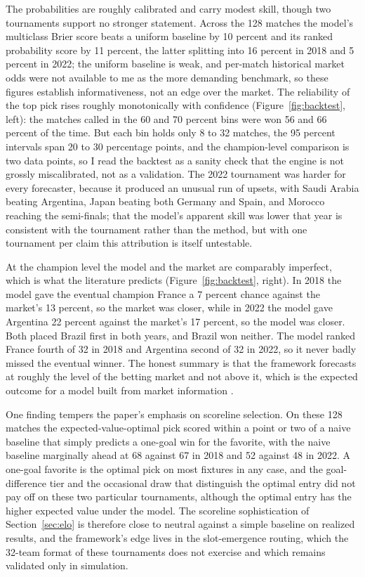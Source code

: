 \documentclass[11pt,letterpaper]{article}
\begin{document}
The probabilities are roughly calibrated and carry modest skill, though two tournaments support no stronger statement. Across the 128 matches the model's multiclass Brier score beats a uniform baseline by 10 percent and its ranked probability score \citep{constantinou2012} by 11 percent, the latter splitting into 16 percent in 2018 and 5 percent in 2022; the uniform baseline is weak, and per-match historical market odds were not available to me as the more demanding benchmark, so these figures establish informativeness, not an edge over the market. The reliability of the top pick rises roughly monotonically with confidence (Figure~\ref{fig:backtest}, left): the matches called in the 60 and 70 percent bins were won 56 and 66 percent of the time. But each bin holds only 8 to 32 matches, the 95 percent intervals span 20 to 30 percentage points, and the champion-level comparison is two data points, so I read the backtest as a sanity check that the engine is not grossly miscalibrated, not as a validation. The 2022 tournament was harder for every forecaster, because it produced an unusual run of upsets, with Saudi Arabia beating Argentina, Japan beating both Germany and Spain, and Morocco reaching the semi-finals; that the model's apparent skill was lower that year is consistent with the tournament rather than the method, but with one tournament per claim this attribution is itself untestable.

At the champion level the model and the market are comparably imperfect, which is what the literature predicts (Figure~\ref{fig:backtest}, right). In 2018 the model gave the eventual champion France a 7 percent chance against the market's 13 percent, so the market was closer, while in 2022 the model gave Argentina 22 percent against the market's 17 percent, so the model was closer. Both placed Brazil first in both years, and Brazil won neither. The model ranked France fourth of 32 in 2018 and Argentina second of 32 in 2022, so it never badly missed the eventual winner. The honest summary is that the framework forecasts at roughly the level of the betting market and not above it, which is the expected outcome for a model built from market information \citep{strumbelj2014, hvattum2010}.

One finding tempers the paper's emphasis on scoreline selection. On these 128 matches the expected-value-optimal pick scored within a point or two of a naive baseline that simply predicts a one-goal win for the favorite, with the naive baseline marginally ahead at 68 against 67 in 2018 and 52 against 48 in 2022. A one-goal favorite is the optimal pick on most fixtures in any case, and the goal-difference tier and the occasional draw that distinguish the optimal entry did not pay off on these two particular tournaments, although the optimal entry has the higher expected value under the model. The scoreline sophistication of Section~\ref{sec:elo} is therefore close to neutral against a simple baseline on realized results, and the framework's edge lives in the slot-emergence routing, which the 32-team format of these tournaments does not exercise and which remains validated only in simulation.
\end{document}
